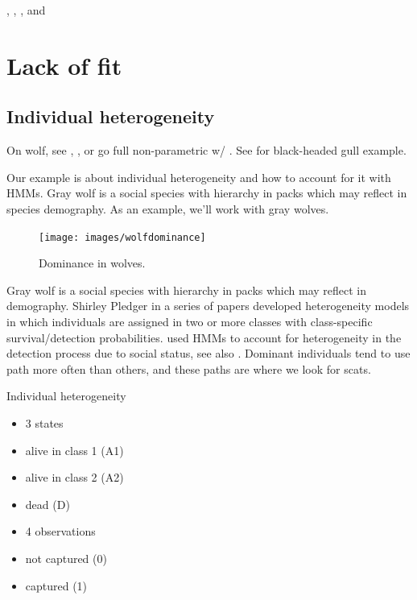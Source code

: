 \documentclass[
  12pt,
]{krantz}
\begin{document}
\citet{pradel_breeding_2012}, \citet{desprez_now_2011}, \citet{desprez_known_2013}, and \citet{pacoureau_population_2019}

\hypertarget{lackoffit}{%
\chapter{Lack of fit}\label{lackoffit}}

\hypertarget{individual-heterogeneity}{%
\section{Individual heterogeneity}\label{individual-heterogeneity}}

On wolf, see \citet{cubaynes_importance_2010}, \citet{gimenez_individual_2010}, or go full non-parametric w/ \citet{turek_bayesian_2021}. See \citet{pradel2009} for black-headed gull example.

Our example is about individual heterogeneity and how to account for it with HMMs. Gray wolf is a social species with hierarchy in packs which may reflect in species demography. As an example, we'll work with gray wolves.

\begin{figure}

{\centering \texttt{[image: images/wolfdominance]} 

}

\caption{Dominance in wolves.}\label{fig:pixwolf}
\end{figure}

Gray wolf is a social species with hierarchy in packs which may reflect in demography. Shirley Pledger in a series of papers developed heterogeneity models in which individuals are assigned in two or more classes with class-specific survival/detection probabilities. \citet{cubaynes_importance_2010} used HMMs to account for heterogeneity in the detection process due to social status, see also \citet{pradel2009}. Dominant individuals tend to use path more often than others, and these paths are where we look for scats.

Individual heterogeneity

\begin{itemize}
\item
  3 states
\item
  alive in class 1 (A1)
\item
  alive in class 2 (A2)
\item
  dead (D)
\item
  4 observations
\item
  not captured (0)
\item
  captured (1)
\end{itemize}
\end{document}
